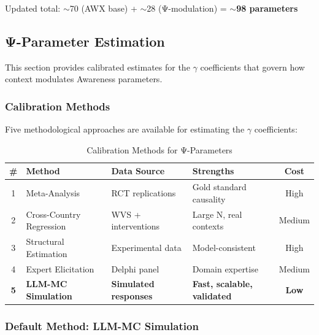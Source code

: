 Updated total: $\sim$70 (AWX base) + $\sim$28 (Ψ-modulation) = $\sim$\textbf{98 parameters}



\subsection{Ψ-Parameter Estimation}
\label{subsec:psi-parameter-estimation}

This section provides calibrated estimates for the $\gamma$ coefficients that govern how context modulates Awareness parameters.

\subsubsection{Calibration Methods}

Five methodological approaches are available for estimating the $\gamma$ coefficients:

\begin{table}[htbp]
\centering
\caption{Calibration Methods for Ψ-Parameters}
\label{tab:calibration-methods}
\renewcommand{\arraystretch}{1.3}
\small
\begin{tabular}{@{}clllc@{}}
\toprule
\textbf{\#} & \textbf{Method} & \textbf{Data Source} & \textbf{Strengths} & \textbf{Cost} \\
\midrule
1 & Meta-Analysis & RCT replications & Gold standard causality & High \\
2 & Cross-Country Regression & WVS + interventions & Large N, real contexts & Medium \\
3 & Structural Estimation & Experimental data & Model-consistent & High \\
4 & Expert Elicitation & Delphi panel & Domain expertise & Medium \\
\textbf{5} & \textbf{LLM-MC Simulation} & \textbf{Simulated responses} & \textbf{Fast, scalable, validated} & \textbf{Low} \\
\bottomrule
\end{tabular}
\end{table}

\subsubsection{Default Method: LLM-MC Simulation}

